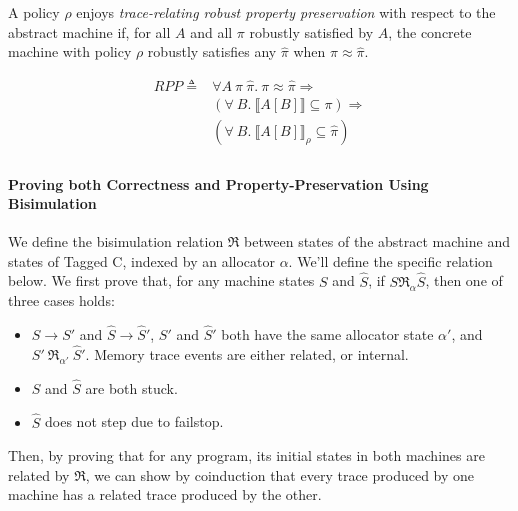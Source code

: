 \documentclass{article}
\begin{document}
A policy \(\rho\) enjoys {\em trace-relating robust property preservation} with respect to the
abstract machine if, for all \(A\) and all \(\pi\) robustly satisfied by \(A\), the concrete
machine with policy \(\rho\) robustly satisfies any \(\hat{\pi}\) when \(\pi \approx \hat{\pi}\).

\[\begin{split}
\mathit{RPP} \triangleq & \forall A ~ \pi ~ \hat{\pi} . ~ \pi \approx \hat{\pi} \Rightarrow \\
& (\forall ~ B . ~ \llbracket A[B] \rrbracket \subseteq \pi) \Rightarrow \\
& (\forall ~ B . ~ \llbracket A[B] \rrbracket_\rho \subseteq \hat{\pi}) \\
\end{split}\]

\paragraph{Proving both Correctness and Property-Preservation Using Bisimulation}

We define the bisimulation relation \(\mathfrak{R}\) between states of the abstract machine and
states of Tagged C, indexed by an allocator \(\alpha\). We'll define the specific relation
below. We first prove that, for any machine states \(S\) and
\(\hat{S}\), if \(S \mathfrak{R}_\alpha \hat{S}\), then one of three cases holds:
\begin{itemize}
\item \(S \longrightarrow S'\) and \(\hat{S} \longrightarrow \hat{S}'\), \(S'\) and \(\hat{S}'\)
  both have the same allocator state \(\alpha'\), and \(S' ~ \mathfrak{R}_{\alpha'} ~ \hat{S}'\).
  Memory trace events are either related, or internal.
\item \(S\) and \(\hat{S}\) are both stuck.
\item \(\hat{S}\) does not step due to failstop.
\end{itemize}

Then, by proving that for any program, its initial states in both machines are related
by \(\mathfrak{R}\), we can show by coinduction that every trace produced by one machine
has a related trace produced by the other.


\begin{comment}

Recall that \(\alpha\) contains a live-list
that maps allocations to concrete base addresses. A shared pointer
\(\mathit{sptr} ~ b ~ \mathit{off}\) is related to a tagged value \(v \tagat \vt[]\) if
\(b\) maps to some base address \(\mathit{addr}\) and \(\mathit{addr} + \mathit{off} = v\).

Two addresses are related by
\(\mathfrak{R}\) if:

\begin{itemize}
  \item 
\end{itemize}

\end{comment}
\end{document}
